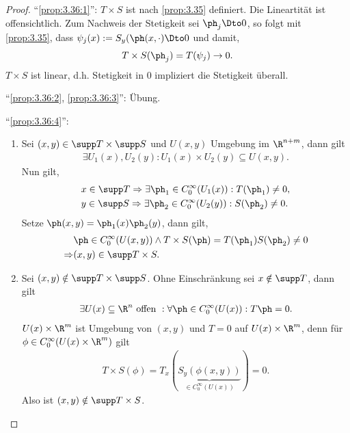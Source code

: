 \begin{proof}
``\ref{prop:3.36:1}'': $T\times S$ ist nach \ref{prop:3.35} definiert. Die
Lineartität ist offensichtlich. Zum Nachweis der Stetigkeit sei $\ph_j\Dto 0$,
so folgt mit \ref{prop:3.35}, dass $\psi_j(x):= S_y(\ph(x,\cdot)\Dto 0$ und
damit,
\begin{align*}
T\times S(\ph_j) = T(\psi_j) \to 0.
\end{align*}
$T\times S$ ist linear, d.h. Stetigkeit in $0$ impliziert die Stetigkeit
überall.

``\ref{prop:3.36:2}, \ref{prop:3.36:3}'': Übung.

``\ref{prop:3.36:4}'': 
\begin{enumerate}[label=(\alph{*})]
  \item Sei $(x,y)\in\supp T\times \supp S$ und $U(x,y)$ Umgebung im
  $\R^{n+m}$, dann gilt
\begin{align*}
\exists U_1(x), U_2(y) : U_1(x)\times U_2(y) \subseteq U(x,y).
\end{align*}
Nun gilt,
\begin{align*}
&x\in\supp T\Rightarrow \exists \ph_1 \in C_0^\infty(U_1(x)) : T(\ph_1)\neq 0,\\
&y\in \supp S\Rightarrow \exists \ph_2 \in C_0^\infty(U_2(y)) : S(\ph_2)\neq 0.
\end{align*}
Setze $\ph(x,y) = \ph_1(x)\ph_2(y)$, dann gilt,
\begin{align*}
&\ph\in C_0^\infty(U(x,y)) \land
T\times S(\ph)  = T(\ph_1)S(\ph_2) \neq 0\\
\Rightarrow &(x,y)\in \supp T\times S.
\end{align*}
\item Sei $(x,y)\notin \supp T\times \supp S$. Ohne Einschränkung sei $x\notin
\supp T$, dann gilt
\begin{align*}
\exists U(x) \subseteq \R^n\text{ offen } : \forall \ph\in C_0^\infty(U(x)) :
T\ph = 0.
\end{align*}
$U(x)\times \R^m$ ist Umgebung von $(x,y)$ und $T=0$ auf $U(x)\times \R^m$,
denn für $\phi\in C_0^\infty(U(x)\times\R^m)$ gilt
\begin{align*}
T\times S(\phi) = T_x(\underbrace{S_y(\phi(x,y))}_{\in C_0^\infty(U(x))}) = 0.
\end{align*}
Also ist $(x,y)\notin \supp T\times S$.\qedhere
\end{enumerate}
\end{proof}

